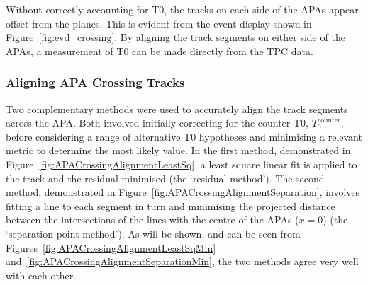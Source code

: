 Without correctly accounting for T0, the tracks on each side of the APAs appear offset from the planes.  This is evident from the event display shown in Figure~\ref{fig:evd_crossing}.  By aligning the track segments on either side of the APAs, a measurement of T0 can be made directly from the TPC data.

\subsubsection{Aligning APA Crossing Tracks}\label{sec:APACrossingAlignment}

Two complementary methods were used to accurately align the track segments across the APA.  Both involved initially correcting for the counter T0, $T_0^{\mathrm{counter}}$, before considering a range of alternative T0 hypotheses and minimising a relevant metric to determine the most likely value.  In the first method, demonstrated in Figure~\ref{fig:APACrossingAlignmentLeastSq}, a least square linear fit is applied to the track and the residual minimised (the `residual method').  The second method, demonstrated in Figure~\ref{fig:APACrossingAlignmentSeparation}, involves fitting a line to each segment in turn and minimising the projected distance between the intersections of the lines with the centre of the APAs ($x=0$) (the `separation point method').  As will be shown, and can be seen from Figures~\ref{fig:APACrossingAlignmentLeastSqMin} and~\ref{fig:APACrossingAlignmentSeparationMin}, the two methods agree very well with each other.

